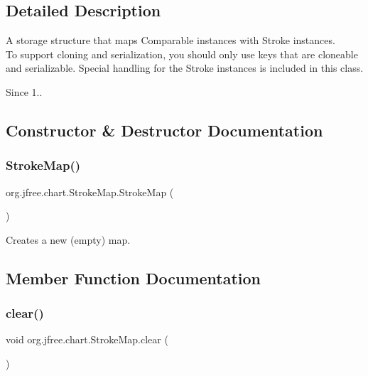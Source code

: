\subsection{Detailed Description}
A storage structure that maps {\ttfamily Comparable} instances with {\ttfamily Stroke} instances. ~\newline
~\newline
 To support cloning and serialization, you should only use keys that are cloneable and serializable. Special handling for the {\ttfamily Stroke} instances is included in this class.

\begin{DoxySince}{Since}
1.. 
\end{DoxySince}


\subsection{Constructor \& Destructor Documentation}
\mbox{\label{classorg_1_1jfree_1_1chart_1_1_stroke_map_a60c6945cdf4cc6e625e03711f4bf5990}} 
\subsubsection{\texorpdfstring{Stroke\+Map()}{StrokeMap()}}
{\footnotesize\ttfamily org.\+jfree.\+chart.\+Stroke\+Map.\+Stroke\+Map (\begin{DoxyParamCaption}{ }\end{DoxyParamCaption})}

Creates a new (empty) map. 

\subsection{Member Function Documentation}
\mbox{\label{classorg_1_1jfree_1_1chart_1_1_stroke_map_aff7c16c1469546634e06de218cffbc83}} 
\subsubsection{\texorpdfstring{clear()}{clear()}}
{\footnotesize\ttfamily void org.\+jfree.\+chart.\+Stroke\+Map.\+clear (\begin{DoxyParamCaption}{ }\end{DoxyParamCaption})}

